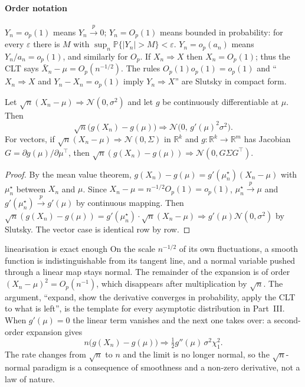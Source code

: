 \documentclass[11pt,a4paper]{article}
\renewcommand{\P}{\mathbb{P}}
\newcommand{\R}{\mathbb{R}}
\newcommand{\N}{\mathcal{N}}
\newcommand{\cp}{\xrightarrow{\;p\;}}
\newcommand{\cd}{\Rightarrow}
\newcommand{\op}{o_p}
\newcommand{\Op}{O_p}
\newcommand{\Xbar}{\bar X_n}
\begin{document}
\paragraph{Order notation}
$Y_n=\op(1)$ means $Y_n\cp0$; $Y_n=\Op(1)$ means bounded in probability: for every $\varepsilon$ there is $M$ with $\sup_n\P\{|Y_n|>M\}<\varepsilon$. $Y_n=\op(a_n)$ means $Y_n/a_n=\op(1)$, and similarly for $\Op$. If $X_n\cd X$ then $X_n=\Op(1)$; thus the CLT says $\Xbar-\mu=\Op(n^{-1/2})$. The rules $\Op(1)\op(1)=\op(1)$ and ``$X_n\cd X$ and $Y_n-X_n=\op(1)$ imply $Y_n\cd X$'' are Slutsky in compact form.

\begin{theorem}\label{thm:delta}
Let $\sqrt n(X_n-\mu)\cd\N(0,\sigma^2)$ and let $g$ be continuously differentiable at $\mu$. Then
\[
\sqrt n\big(g(X_n)-g(\mu)\big)\cd\N\big(0,\,g'(\mu)^2\sigma^2\big).
\]
For vectors, if $\sqrt n(X_n-\mu)\cd\N(0,\Sigma)$ in $\R^k$ and $g:\R^k\to\R^m$ has Jacobian $G=\partial g(\mu)/\partial\mu^\top$, then $\sqrt n(g(X_n)-g(\mu))\cd\N(0,G\Sigma G^\top)$.
\end{theorem}

\begin{proof}
By the mean value theorem, $g(X_n)-g(\mu)=g'(\mu_n^\star)(X_n-\mu)$ with $\mu_n^\star$ between $X_n$ and $\mu$. Since $X_n-\mu=n^{-1/2}\Op(1)=\op(1)$, $\mu_n^\star\cp\mu$ and $g'(\mu_n^\star)\cp g'(\mu)$ by continuous mapping. Then $\sqrt n(g(X_n)-g(\mu))=g'(\mu_n^\star)\cdot\sqrt n(X_n-\mu)\cd g'(\mu)\N(0,\sigma^2)$ by Slutsky. The vector case is identical row by row.
\end{proof}

\begin{whybox}{linearisation is exact enough}
On the scale $n^{-1/2}$ of its own fluctuations, a smooth function is indistinguishable from its tangent line, and a normal variable pushed through a linear map stays normal. The remainder of the expansion is of order $(X_n-\mu)^2=\Op(n^{-1})$, which disappears after multiplication by $\sqrt n$. The argument, ``expand, show the derivative converges in probability, apply the CLT to what is left'', is the template for every asymptotic distribution in Part~III. When $g'(\mu)=0$ the linear term vanishes and the next one takes over: a second-order expansion gives
\[
n\big(g(X_n)-g(\mu)\big)\cd\tfrac12g''(\mu)\,\sigma^2\chi^2_1 .
\]
The rate changes from $\sqrt n$ to $n$ and the limit is no longer normal, so the $\sqrt n$-normal paradigm is a consequence of smoothness and a non-zero derivative, not a law of nature.
\end{whybox}
\end{document}
